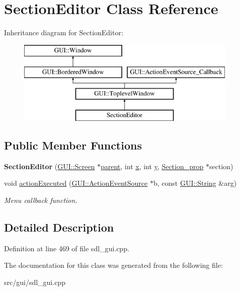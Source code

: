 \hypertarget{classSectionEditor}{\section{Section\-Editor Class Reference}
\label{classSectionEditor}
}
Inheritance diagram for Section\-Editor\-:\begin{figure}[H]
\begin{center}
\leavevmode
\includegraphics[height=4.000000cm]{classSectionEditor}
\end{center}
\end{figure}
\subsection*{Public Member Functions}
\begin{DoxyCompactItemize}
\item 
\hypertarget{classSectionEditor_a5b4b01aaafcd5cb87b20e5aa7cab7f87}{{\bfseries Section\-Editor} (\hyperlink{classGUI_1_1Screen}{G\-U\-I\-::\-Screen} $\ast$\hyperlink{classGUI_1_1Window_a2e593ff65e7702178d82fe9010a0b539}{parent}, int \hyperlink{classGUI_1_1Window_a6ca6a80ca00c9e1d8ceea8d3d99a657d}{x}, int \hyperlink{classGUI_1_1Window_a0ee8e923aff2c3661fc2e17656d37adf}{y}, \hyperlink{classSection__prop}{Section\-\_\-prop} $\ast$section)}\label{classSectionEditor_a5b4b01aaafcd5cb87b20e5aa7cab7f87}

\item 
\hypertarget{classSectionEditor_affef3df8632e3d7cef272a5cbcd4728f}{void \hyperlink{classSectionEditor_affef3df8632e3d7cef272a5cbcd4728f}{action\-Executed} (\hyperlink{classGUI_1_1ActionEventSource}{G\-U\-I\-::\-Action\-Event\-Source} $\ast$b, const \hyperlink{classGUI_1_1String}{G\-U\-I\-::\-String} \&arg)}\label{classSectionEditor_affef3df8632e3d7cef272a5cbcd4728f}

\begin{DoxyCompactList}\small\item\em Menu callback function. \end{DoxyCompactList}\end{DoxyCompactItemize}


\subsection{Detailed Description}


Definition at line 469 of file sdl\-\_\-gui.\-cpp.



The documentation for this class was generated from the following file\-:\begin{DoxyCompactItemize}
\item 
src/gui/sdl\-\_\-gui.\-cpp\end{DoxyCompactItemize}
